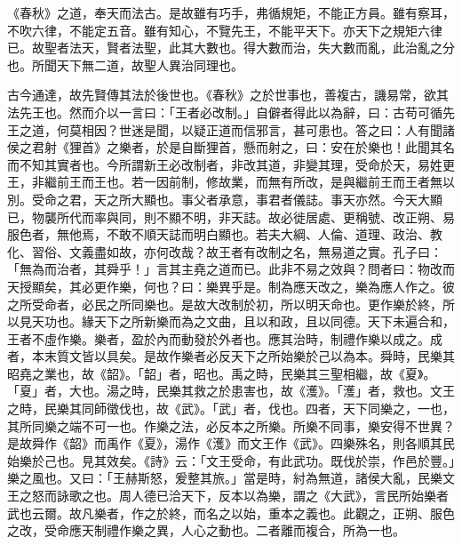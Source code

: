 《春秋》之道，奉天而法古。是故雖有巧手，弗循規矩，不能正方員。雖有察耳，不吹六律，不能定五音。雖有知心，不覽先王，不能平天下。亦天下之規矩六律已。故聖者法天，賢者法聖，此其大數也。得大數而治，失大數而亂，此治亂之分也。所聞天下無二道，故聖人異治同理也。


古今通達，故先賢傳其法於後世也。《春秋》之於世事也，善複古，譏易常，欲其法先王也。然而介以一言曰：「王者必改制。」自僻者得此以為辭，曰：古苟可循先王之道，何莫相因？世迷是聞，以疑正道而信邪言，甚可患也。答之曰：人有聞諸侯之君射《狸首》之樂者，於是自斷狸首，懸而射之，曰：安在於樂也！此聞其名而不知其實者也。今所謂新王必改制者，非改其道，非變其理，受命於天，易姓更王，非繼前王而王也。若一因前制，修故業，而無有所改，是與繼前王而王者無以別。受命之君，天之所大顯也。事父者承意，事君者儀誌。事天亦然。今天大顯已，物襲所代而率與同，則不顯不明，非天誌。故必徙居處、更稱號、改正朔、易服色者，無他焉，不敢不順天誌而明白顯也。若夫大綱、人倫、道理、政治、教化、習俗、文義盡如故，亦何改哉？故王者有改制之名，無易道之實。孔子曰：「無為而治者，其舜乎！」言其主堯之道而已。此非不易之效與？問者曰：物改而天授顯矣，其必更作樂，何也？曰：樂異乎是。制為應天改之，樂為應人作之。彼之所受命者，必民之所同樂也。是故大改制於初，所以明天命也。更作樂於終，所以見天功也。緣天下之所新樂而為之文曲，且以和政，且以同德。天下未遍合和，王者不虛作樂。樂者，盈於內而動發於外者也。應其治時，制禮作樂以成之。成者，本末質文皆以具矣。是故作樂者必反天下之所始樂於己以為本。舜時，民樂其昭堯之業也，故《韶》。「韶」者，昭也。禹之時，民樂其三聖相繼，故《夏》。「夏」者，大也。湯之時，民樂其救之於患害也，故《濩》。「濩」者，救也。文王之時，民樂其同師徵伐也，故《武》。「武」者，伐也。四者，天下同樂之，一也，其所同樂之端不可一也。作樂之法，必反本之所樂。所樂不同事，樂安得不世異？是故舜作《韶》而禹作《夏》，湯作《濩》而文王作《武》。四樂殊名，則各順其民始樂於己也。見其效矣。《詩》云：「文王受命，有此武功。既伐於崇，作邑於豐。」樂之風也。又曰：「王赫斯怒，爰整其旅。」當是時，紂為無道，諸侯大亂，民樂文王之怒而詠歌之也。周人德已洽天下，反本以為樂，謂之《大武》，言民所始樂者武也云爾。故凡樂者，作之於終，而名之以始，重本之義也。此觀之，正朔、服色之改，受命應天制禮作樂之異，人心之動也。二者離而複合，所為一也。


